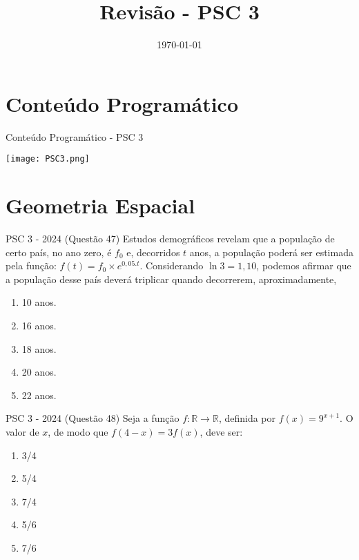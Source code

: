 \documentclass[aspectratio=169]{beamer}
\title[CETi Gilberto Mestrinho]{Revisão - PSC 3}
\date{\today}
\newif\ifusarcorvermelha
\newcommand{\vermelho}[1]{%
    \ifusarcorvermelha
        {\color{red}#1}%
    \else
        #1%
    \fi
}
\begin{document}
\justifying
\onehalfspacing


\begin{frame}
    \titlepage
\end{frame}

\section{Conteúdo Programático}

\begin{frame}{Conteúdo Programático - PSC 3}

    \begin{center}
        \texttt{[image: PSC3.png]}
    \end{center}
    
\end{frame}

\section{Geometria Espacial}

    \begin{frame}{PSC 3 - 2024 (Questão 47)}
        Estudos demográficos revelam que a população de certo país, no ano zero, é $f_{0}$ e, decorridos $t$ anos, a população poderá ser estimada pela função: $f(t)=f_{0} \times  e^{0,05 . t}$. Considerando $\ln{3}=1,10$, podemos afirmar que a população desse país deverá triplicar quando decorrerem, aproximadamente,

            \begin{enumerate}[a]
                \item 10 anos.
                \item 16 anos.
                \item 18 anos.
                \item 20 anos.
                \item \vermelho{22 anos.} %
            \end{enumerate}
            
    \end{frame}


    \begin{frame}{PSC 3 - 2024 (Questão 48)}
        Seja a função $f: \mathbb{R} \to \mathbb{R}$, definida por $f(x)=9^{x+1}$. O valor de $x$, de modo que $f(4-x)=3f(x)$, deve ser:
        
            \begin{enumerate}[a]
                \item {3}/{4}
                \item {5}/{4}
                \item \vermelho{{7}/{4}} %
                \item {5}/{6}
                \item {7}/{6}
            \end{enumerate}
            
    \end{frame}
\end{document}
